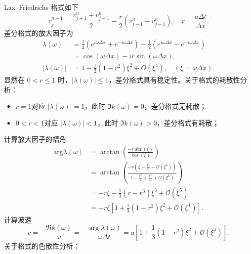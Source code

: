 \begin{solution*}
    Lax–Friedrichs 格式如下
    \[
        v_{j}^{n+1} = \frac{v_{j+1}^n+v_{j-1}^n}{2} - \frac{r}2 (v_{j+1}^n-v_{j-1}^n),\quad r = \frac{a \Delta t}{\Delta x}.
    \]
    差分格式的放大因子为
    \begin{align*}
        \lambda(\omega)   & = \frac{1}2(e^{i \omega \Delta x} + e^{- i \omega \Delta x})
        - \frac{1}2 (e^{i \omega \Delta x} - e^{- i \omega \Delta x})                            \\
                          & =
        \cos(\omega \Delta x) - i r \sin(\omega \Delta x),                                       \\
        |\lambda(\omega)| & = 1 - \frac12 (1-r^2) \xi^2 + O(\xi^4),\quad (\xi = \omega \Delta x).
    \end{align*}
    显然在 $ 0< r \le 1$ 时，$|\lambda(\omega)| \le 1$，差分格式具有稳定性。关于格式的耗散性分析：
    \begin{itemize}
        \item $r=1$对应 $|\lambda(\omega)| = 1$，此时 $\Im k(\omega) = 0$，差分格式无耗散；
        \item $0<r<1$对应 $|\lambda(\omega)| < 1$，此时 $\Im k(\omega) > 0$，差分格式有耗散；
    \end{itemize}
    计算放大因子的幅角
    \begin{align*}
        \text{arg} \lambda(\omega) & =
        \arctan \left(\frac{
                - r \sin(\xi)
            }{
                \cos(\xi)
            }     \right)
        \\
                                   & =
        \arctan \left(\frac{
                -r (\xi - \frac{\xi^3}{3!} + \mathcal{O}(\xi^5))
            }{
                1 - \frac{\xi^2}2 + \frac{\xi^4}{4!} + \mathcal{O}(\xi^6)
        }     \right)                                           \\
                                   & =
        - r \xi - \frac13 (r - r^3) \xi^3 +  \mathcal{O}(\xi^5) \\
                                   & = - r\xi \left[
            1 + \frac13 (1-r^2)\xi^2 +  \mathcal{O}(\xi^4)
            \right].
    \end{align*}
    计算波速
    \[
        c = -\frac{\Re k(\omega)}{\omega} = - \frac{\arg \lambda(\omega)}{ \omega\Delta t} = a  \left[
            1 + \frac13 (1-r^2)\xi^2 +  \mathcal{O}(\xi^4)
            \right].
    \]
    关于格式的色散性分析：
    \begin{itemize}

\end{itemize}
\end{solution*}
